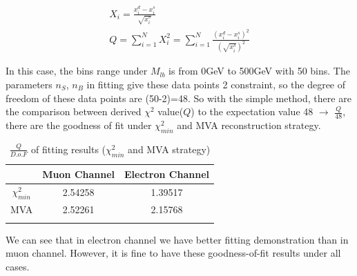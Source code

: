		\begin{equation}
		\begin{split}
		X_i = \frac{x^d_i - x^s_i}{\sqrt{x^s_i}} \\
		Q = \sum_{i=1}^{N} X_i^2 = \sum_{i=1}^{N} \frac{(x^d_i - x^s_i)^2}{(\sqrt{x^s_i})^2}
		\label{eq:chi2_dis_this}
		\end{split}
		\end{equation}

		In this case, the bins range under $M_{lb}$ is from 0GeV to 500GeV with 50 bins. The parameters $n_S$, $n_B$ in fitting give these data points 2 constraint, so the degree of freedom of these data points are (50-2)=48. So with the simple method, there are the comparison between derived $\chi^2$ value($Q$) to the expectation value 48 $\longrightarrow$ $\frac{Q}{48}$, there are the goodness of fit under $\chi^2_{min}$ and MVA reconstruction strategy.

		\begin{center}
		\begin{longtable}[H]{ c c c }
		\caption{$\frac{Q}{D.o.F}$ of fitting results ($\chi^2_{min}$ and MVA strategy)} \\
		\hline
		 & Muon Channel & Electron Channel \\ 
		\hline
		$\chi^2_{min}$ & 2.54258 & 1.39517 \\
		MVA & 2.52261 & 2.15768 \\
		\hline
		\label{BkgEst:tb:goodness_of_fit}
		\end{longtable}
		\end{center}
		\FloatBarrier

		We can see that in electron channel we have better fitting demonstration than in muon channel. However, it is fine to have these goodness-of-fit results under all cases.


\FloatBarrier
